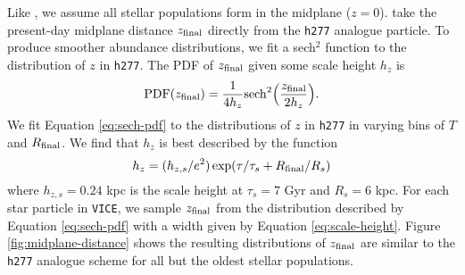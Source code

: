 \documentclass[twocolumn,twocolappendix,linenumbers]{aastex631}
\newcommand{\vice}{{\tt VICE}\xspace}
\newcommand{\hydro}{{\tt h277}\xspace}
\begin{document}
Like , we assume all stellar populations form in the midplane ($z=0$).  take the present-day midplane distance $z_{\rm final}$ directly from the \hydro analogue particle. To produce smoother abundance distributions, we fit a sech$^2$ function \citep{Spitzer1942} to the distribution of $z$ in \hydro. 
The PDF of $z_{\rm final}$ given some scale height $h_z$ is
\begin{equation}
    {\rm PDF}(z_{\rm final}) = \frac{1}{4 h_z} {\rm sech}^2\Big(\frac{z_{\rm final}}{2 h_z}\Big).
    \label{eq:sech-pdf}
\end{equation}
We fit Equation \ref{eq:sech-pdf} to the distributions of $z$ in \hydro in varying bins of $T$ and $R_{\rm final}$. We find that $h_z$ is best described by the function
\begin{equation}
    h_z = (h_{z,s}/e^2) \exp(\tau/\tau_s + R_{\rm final}/R_s)
    \label{eq:scale-height}
\end{equation}
where $h_{z,s}=0.24$ kpc is the scale height at $\tau_s=7$ Gyr and $R_s=6$ kpc.
For each star particle in \vice, we sample $z_{\rm final}$ from the distribution described by Equation \ref{eq:sech-pdf} with a width given by Equation \ref{eq:scale-height}. Figure \ref{fig:midplane-distance} shows the resulting distributions of $z_{\rm final}$ are similar to the \hydro analogue scheme for all but the oldest stellar populations.


\end{document}
